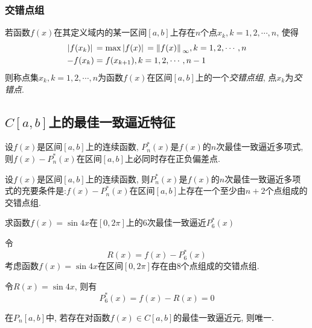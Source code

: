 \subsubsection{交错点组}

\begin{definition}
    若函数$f(x)$在其定义域内的某一区间$[a,b]$上存在$n$个点${x_k},k=1,2,\cdots,n$, 使得
    \begin{align*}
        \abs*{f(x_k)}&=\max\abs*{f(x)}=\norm*{f(x)}_\infty, k=1,2,\cdots,n\\
        -f(x_k)&=f(x_{k+1}), k=1,2,\cdots,n-1
    \end{align*}
    则称点集${x_k},k=1,2,\cdots,n$为函数$f(x)$在区间$[a,b]$上的一个\emph{交错点组}, 点$x_k$为\emph{交错点}.
\end{definition}

\subsection{$C[a,b]$上的最佳一致逼近特征}

\begin{lemma}
    设$f(x)$是区间$[a,b]$上的连续函数, $P_n^*(x)$是$f(x)$的$n$次最佳一致逼近多项式, 则$f(x)-P_n^*(x)$在区间$[a,b]$上必同时存在正负偏差点.
\end{lemma}

\begin{theorem}[Chebyshev定理]
    设$f(x)$是区间$[a,b]$上的连续函数, 则$P_n^*(x)$是$f(x)$的$n$次最佳一致逼近多项式的充要条件是:$f(x)-P_n^*(x)$在区间$[a,b]$上存在一个至少由$n+2$个点组成的交错点组.
\end{theorem}

\begin{example}
    求函数$f(x)=\sin{4x}$在$[0,2\pi]$上的6次最佳一致逼近$P_6^*(x)$
\end{example}

\begin{solution}
    令
    \begin{equation*}
        R(x)=f(x)-P_6^*(x)
    \end{equation*}
    考虑函数$f(x)=\sin{4x}$在区间$[0,2\pi]$存在由8个点组成的交错点组.

    令$R(x)=\sin{4x}$, 则有
    \begin{equation*}
        P_6^*(x)=f(x)-R(x)=0
    \end{equation*}
\end{solution}

\begin{corollary}
    在$P_n[a,b]$中, 若存在对函数$f(x)\in C[a,b]$的最佳一致逼近元, 则唯一.
\end{corollary}

